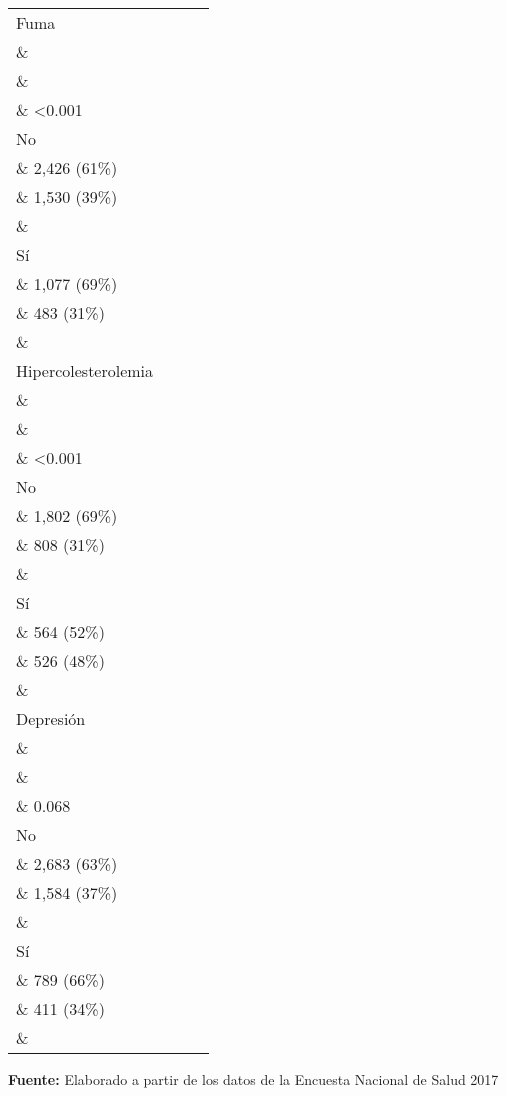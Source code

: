 \documentclass{aa}
\begin{document}
\begin{table}[]
\begin{tabular}{lccc}
Fuma \\\&  \\\&  \\\& <0.001 \\ 
\-\hspace{5mm} \tiny No \\\& 2,426 (61\%) \\\& 1,530 (39\%) \\\&  \\ 
\-\hspace{5mm} \tiny Sí \\\& 1,077 (69\%) \\\& 483 (31\%) \\\&  \\ 
Hipercolesterolemia \\\&  \\\&  \\\& <0.001 \\ 
\-\hspace{5mm} \tiny No \\\& 1,802 (69\%) \\\& 808 (31\%) \\\&  \\ 
\-\hspace{5mm} \tiny Sí \\\& 564 (52\%) \\\& 526 (48\%) \\\&  \\ 
Depresión \\\&  \\\&  \\\& 0.068 \\ 
\-\hspace{5mm} \tiny No \\\& 2,683 (63\%) \\\& 1,584 (37\%) \\\&  \\ 
\-\hspace{5mm} \tiny Sí \\\& 789 (66\%) \\\& 411 (34\%) \\\&  \\ 
 \bottomrule
\end{tabular}

    {\raggedright \small \textbf{Fuente:} Elaborado a partir de los datos de la Encuesta Nacional de Salud 2017 \par}
\end{table}
\end{document}
